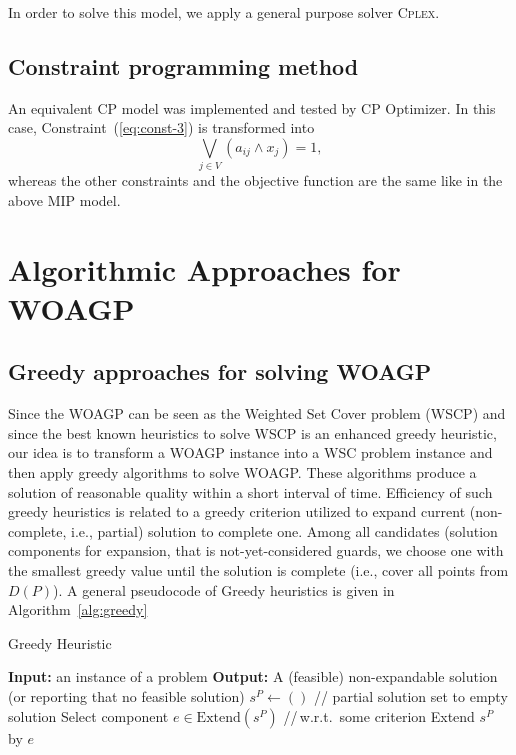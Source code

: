 \documentclass[runningheads,a4paper]{elsarticle}
\begin{document}
      In order to solve this model, we apply a general purpose solver \textsc{Cplex}.
       \subsection{Constraint programming method} An equivalent CP model was implemented and tested by CP Optimizer. In this case,  Constraint~(\ref{eq:const-3}) is transformed into 
       \begin{equation}
           \bigvee_{ j \in V } (a_{ij} \wedge x_j) = 1, 
       \end{equation}
      whereas the other constraints and the objective function are the same like in the above MIP model. 
     \section{Algorithmic Approaches for WOAGP}
     \subsection{Greedy approaches for solving WOAGP}
      Since the WOAGP can be seen as the Weighted Set Cover problem (WSCP) and since the best known heuristics to solve WSCP is an enhanced greedy heuristic, our idea is to transform a WOAGP instance into a WSC problem instance and then
          apply greedy algorithms to solve WOAGP. These algorithms produce a solution of reasonable quality within a short interval of time. Efficiency of such greedy heuristics is related to a greedy criterion utilized to expand current (non-complete, i.e., partial) solution to complete one. Among all candidates (solution components for expansion, that is not-yet-considered guards, we choose one with the smallest greedy value until the solution is complete (i.e., cover all  points from $D(P)$).
          A general pseudocode of Greedy heuristics is given in Algorithm~\ref{alg:greedy}

          \begin{algorithm}[!t]
          	\caption{Greedy Heuristic}\label{alg:greedy}
          	\begin{algorithmic}[1]
          		\State \textbf{Input:} an instance of a problem
          		\State \textbf{Output:} A (feasible) non-expandable solution (or reporting that no feasible solution)
          		\State $s^{P} \gets ()$ \hspace{0.3cm}// partial solution set to empty solution
          		\State Select component $e \in  \text{Extend}(s^{P})$ \hspace{0.3cm}//\,w.r.t.\  some criterion
          		\State Extend $s^{P}$ by $e$
          		\EndWhile
          	\end{algorithmic}
          \end{algorithm}
\end{document}

